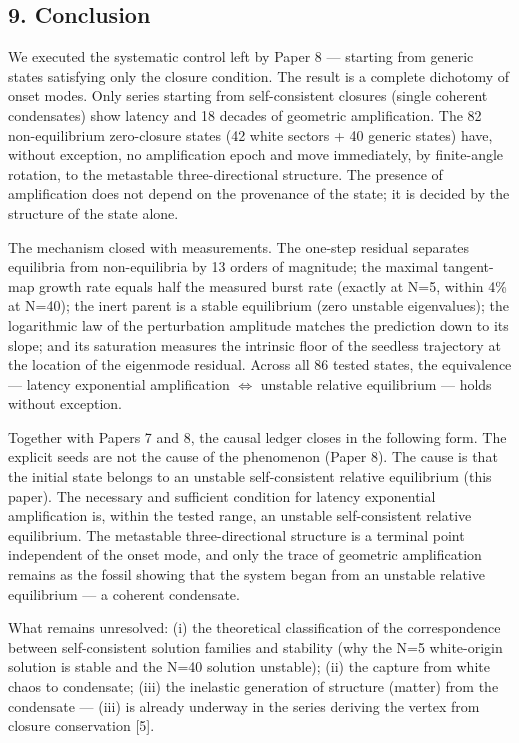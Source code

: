 \documentclass[
  a4paper,
]{article}
\begin{document}
\subsection{9. Conclusion}\label{conclusion}

We executed the systematic control left by Paper 8 --- starting from
generic states satisfying only the closure condition. The result is a
complete dichotomy of onset modes. Only series starting from
self-consistent closures (single coherent condensates) show latency and
18 decades of geometric amplification. The 82 non-equilibrium
zero-closure states (42 white sectors + 40 generic states) have, without
exception, no amplification epoch and move immediately, by finite-angle
rotation, to the metastable three-directional structure. The presence of
amplification does not depend on the provenance of the state; it is
decided by the structure of the state alone.

The mechanism closed with measurements. The one-step residual separates
equilibria from non-equilibria by 13 orders of magnitude; the maximal
tangent-map growth rate equals half the measured burst rate (exactly at
N=5, within 4\% at N=40); the inert parent is a stable equilibrium (zero
unstable eigenvalues); the logarithmic law of the perturbation amplitude
matches the prediction down to its slope; and its saturation measures
the intrinsic floor of the seedless trajectory at the location of the
eigenmode residual. Across all 86 tested states, the equivalence ---
latency exponential amplification \(\iff\) unstable relative equilibrium
--- holds without exception.

Together with Papers 7 and 8, the causal ledger closes in the following
form. The explicit seeds are not the cause of the phenomenon (Paper 8).
The cause is that the initial state belongs to an unstable
self-consistent relative equilibrium (this paper). The necessary and
sufficient condition for latency exponential amplification is, within
the tested range, an unstable self-consistent relative equilibrium. The
metastable three-directional structure is a terminal point independent
of the onset mode, and only the trace of geometric amplification remains
as the fossil showing that the system began from an unstable relative
equilibrium --- a coherent condensate.

What remains unresolved: (i) the theoretical classification of the
correspondence between self-consistent solution families and stability
(why the N=5 white-origin solution is stable and the N=40 solution
unstable); (ii) the capture from white chaos to condensate; (iii) the
inelastic generation of structure (matter) from the condensate --- (iii)
is already underway in the series deriving the vertex from closure
conservation {[}5{]}.
\end{document}
